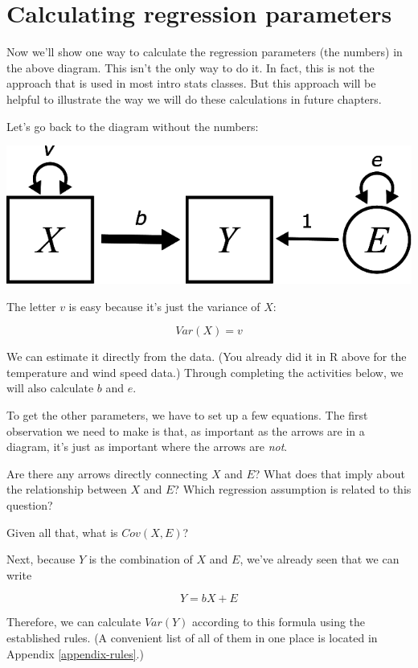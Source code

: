 \documentclass[
]{book}
\begin{document}
\hypertarget{simple-calculating}{%
\section{Calculating regression parameters}\label{simple-calculating}}

Now we'll show one way to calculate the regression parameters (the numbers) in the above diagram. This isn't the only way to do it. In fact, this is not the approach that is used in most intro stats classes. But this approach will be helpful to illustrate the way we will do these calculations in future chapters.

Let's go back to the diagram without the numbers:

\begin{center}\includegraphics{graphics/simple_regression_params} \end{center}

The letter \(v\) is easy because it's just the variance of \(X\):

\[
Var(X) = v
\]

We can estimate it directly from the data. (You already did it in R above for the temperature and wind speed data.) Through completing the activities below, we will also calculate \(b\) and \(e\).

To get the other parameters, we have to set up a few equations.
The first observation we need to make is that, as important as the arrows are in a diagram, it's just as important where the arrows are \emph{not}.

Are there any arrows directly connecting \(X\) and \(E\)? What does that imply about the relationship between \(X\) and \(E\)? Which regression assumption is related to this question?

Given all that, what is \(Cov(X, E)\)?

Next, because \(Y\) is the combination of \(X\) and \(E\), we've already seen that we can write

\[
Y = bX + E
\]

Therefore, we can calculate \(Var(Y)\) according to this formula using the established rules. (A convenient list of all of them in one place is located in Appendix \ref{appendix-rules}.)
\end{document}
